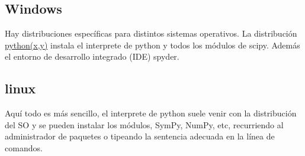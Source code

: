 \subsection{Windows} Hay distribuciones específicas para distintos sistemas operativos. La distribución  \href{https://code.google.com/p/pythonxy/}{python(x,y)}  instala el interprete de python y todos los módulos de scipy. Además el entorno de desarrollo integrado (IDE) spyder.


\subsection{linux} Aquí todo es más sencillo, el interprete de python suele venir con 
la distribución del SO y se pueden instalar los módulos, SymPy, NumPy, etc, 
recurriendo al administrador de paquetes o tipeando la sentencia adecuada en la línea 
de comandos.  

